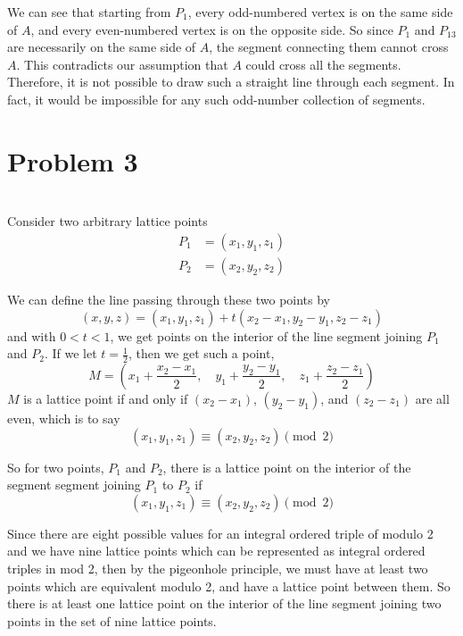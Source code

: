 \documentclass[12pt]{article}
\begin{document}
We can see that starting from $P_1$, every odd-numbered vertex is on the same side of $A$, and every even-numbered vertex is on the opposite side. So since $P_1$ and $P_{13}$ are necessarily on the same side of $A$, the segment connecting them cannot cross $A$. This contradicts our assumption that $A$ could cross all the segments. Therefore, it is not possible to draw such a straight line through each segment. In fact, it would be impossible for any such odd-number collection of segments.

\newpage
\section*{Problem 3}
\\

Consider two arbitrary lattice points
\begin{align*}
    P_1 &= (x_1, y_1, z_1) \\
    P_2 &= (x_2, y_2, z_2)
\end{align*}

We can define the line passing through these two points by
\[(x,y,z) = (x_1, y_1, z_1) + t(x_2-x_1, y_2-y_1, z_2-z_1)\]
and with $0<t<1$, we get points on the interior of the line segment joining $P_1$ and $P_2$. If we let $t=\frac{1}{2}$, then we get such a point,
\[M = \left(x_1 + \frac{x_2-x_1}{2}, \quad y_1 + \frac{y_2-y_1}{2}, \quad z_1 + \frac{z_2-z_1}{2}\right)\]
$M$ is a lattice point if and only if $(x_2-x_1)$, $(y_2-y_1)$, and $(z_2-z_1)$ are all even, which is to say
\[(x_1, y_1, z_1) \equiv (x_2, y_2, z_2) \pmod{2}\]

So for two points, $P_1$ and $P_2$, there is a lattice point on the interior of the segment segment joining $P_1$ to $P_2$ if 
\[(x_1, y_1, z_1) \equiv (x_2, y_2, z_2) \pmod{2}\]

Since there are eight possible values for an integral ordered triple of modulo 2 and we have nine lattice points which can be represented as integral ordered triples in mod 2, then by the pigeonhole principle, we must have at least two points which are equivalent modulo 2, and have a lattice point between them. So there is at least one lattice point on the interior of the line segment joining two points in the set of nine lattice points.
\end{document}
